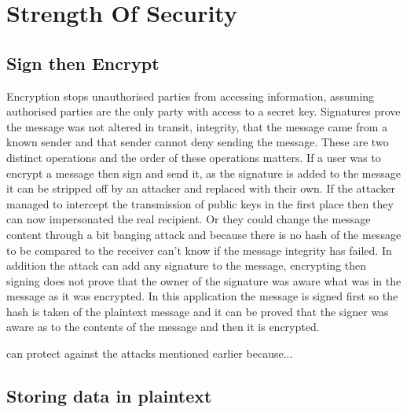 
\chapter{Strength Of Security}
\label{stre}


\section{Sign then Encrypt}

Encryption stops unauthorised parties from accessing information, assuming authorised parties are the only party with access to a secret key. Signatures prove the message was not altered in transit, integrity, that the message came from a known sender and that sender cannot deny sending the message. These are two distinct operations and the order of these operations matters. If a user was to encrypt a message then sign and send it, as the signature is added to the message it can be stripped off by an attacker and replaced with their own. If the attacker managed to intercept the transmission of public keys in the first place then they can now impersonated the real recipient. Or they could change the message content through a bit banging attack and because there is no hash of the message to be compared to the receiver can't know if the message integrity has failed. In addition the attack can add any signature to the message, encrypting then signing does not prove that the owner of the signature was aware what was in the message as it was encrypted. In this application the message is signed first so the hash is taken of the plaintext message and it can be proved that the signer was aware as to the contents of the message and then it is encrypted.

can protect against the attacks mentioned earlier because...


\section{Storing data in plaintext}


